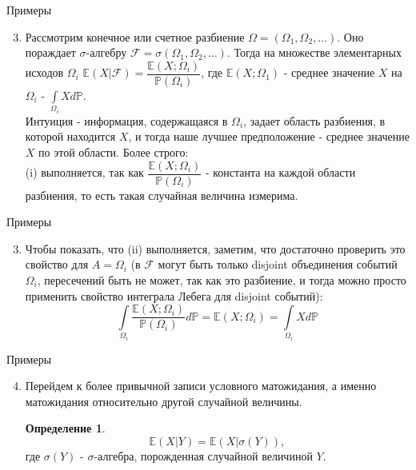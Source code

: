 \documentclass{beamer}%
\theoremstyle{definition}
\newtheorem{mydef}[theorem]{Определение}
\renewcommand{\P}{\mathbb{P}}
\newcommand{\F}{\mathcal{F}}
\begin{document}
\begin{frame}{Примеры}

\begin{enumerate}
\setcounter{enumi}{2}
\item Рассмотрим конечное или счетное разбиение $\Omega=(\Omega_1,\Omega_2,\dotsc)$. Оно пораждает $\sigma$-алгебру $\F=\sigma(\Omega_1,\Omega_2,\dotsc)$. Тогда на множестве элементарных исходов $\Omega_i$ $\mathbb{E}(X|\F)=\dfrac{\mathbb{E}(X; \Omega_i)}{\P(\Omega_i)}$, где $\mathbb{E}(X;\Omega_1)$ - среднее значение $X$ на $\Omega_i$ - $\int\limits_{\Omega_i}Xd\P$.
\\
Интуиция - информация, содержащаяся в $\Omega_i$, задает область разбиения, в которой находится $X$, и тогда наше лучшее предположение - среднее значение $X$ по этой области. Более строго:
\\
(i) выполняется, так как $\dfrac{\mathbb{E}(X; \Omega_i)}{\P(\Omega_i)}$ - константа на каждой области разбиения, то есть такая случайная величина измерима.
\end{enumerate}

\end{frame}


\begin{frame}{Примеры}

\begin{enumerate}
\setcounter{enumi}{2}
\item
Чтобы показать, что (ii) выполняется, заметим, что достаточно проверить это свойство для $A=\Omega_i$ (в $\F$ могут быть только disjoint объединения событий $\Omega_i$, пересечений быть не может, так как это разбиение, и тогда можно просто применить свойство интеграла Лебега для disjoint событий):
$$\int\limits_{\Omega_i}\frac{\mathbb{E}(X; \Omega_i)}{\P(\Omega_i)}d\P=\mathbb{E}(X; \Omega_i)=\int\limits_{\Omega_i}Xd\P$$
\end{enumerate}

\end{frame}


\begin{frame}{Примеры}

\begin{enumerate}
\setcounter{enumi}{3}
\item Перейдем к более привычной записи условного матожидания, а именно матожидания относительно другой случайной величины.
\begin{mydef}
$$\mathbb{E}(X|Y)=\mathbb{E}(X|\sigma(Y)),$$
где $\sigma(Y)$ - $\sigma$-алгебра, порожденная случайной величиной $Y$.
\end{mydef}
\end{enumerate}

\end{frame}
\end{document}
